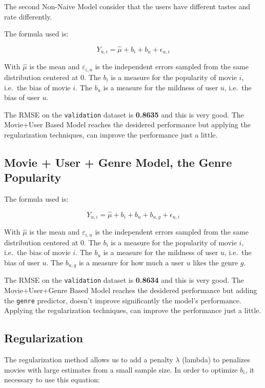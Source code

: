 \documentclass[
]{article}
\begin{document}
The second Non-Naive Model consider that the users have different tastes
and rate differently.

The formula used is:

\[Y_{u,i} = \hat{\mu} + b_i + b_u + \epsilon_{u,i}\]

With \(\hat{\mu}\) is the mean and \(\varepsilon_{i,u}\) is the
independent errors sampled from the same distribution centered at 0. The
\(b_i\) is a measure for the popularity of movie \(i\), i.e.~the bias of
movie \(i\). The \(b_u\) is a measure for the mildness of user \(u\),
i.e.~the bias of user \(u\).

The RMSE on the \texttt{validation} dataset is \textbf{0.8635} and this
is very good. The Movie+User Based Model reaches the desidered
performance but applying the regularization techniques, can improve the
performance just a little.

\hypertarget{movie-user-genre-model-the-genre-popularity}{%
\subsection{Movie + User + Genre Model, the Genre
Popularity}\label{movie-user-genre-model-the-genre-popularity}}

The formula used is:

\[Y_{u,i} = \hat{\mu} + b_i + b_u + b_{u,g} + \epsilon_{u,i}\]

With \(\hat{\mu}\) is the mean and \(\varepsilon_{i,u}\) is the
independent errors sampled from the same distribution centered at 0. The
\(b_i\) is a measure for the popularity of movie \(i\), i.e.~the bias of
movie \(i\). The \(b_u\) is a measure for the mildness of user \(u\),
i.e.~the bias of user \(u\). The \(b_{u,g}\) is a measure for how much a
user \(u\) likes the genre \(g\).

The RMSE on the \texttt{validation} dataset is \textbf{0.8634} and this
is very good. The Movie+User+Genre Based Model reaches the desidered
performance but adding the \texttt{genre} predictor, doesn't improve
significantly the model's performance. Applying the regularization
techniques, can improve the performance just a little.

\hypertarget{regularization}{%
\subsection{Regularization}\label{regularization}}

The regularization method allows us to add a penalty \(\lambda\)
(lambda) to penalizes movies with large estimates from a small sample
size. In order to optimize \(b_i\), it necessary to use this equation:
\end{document}
